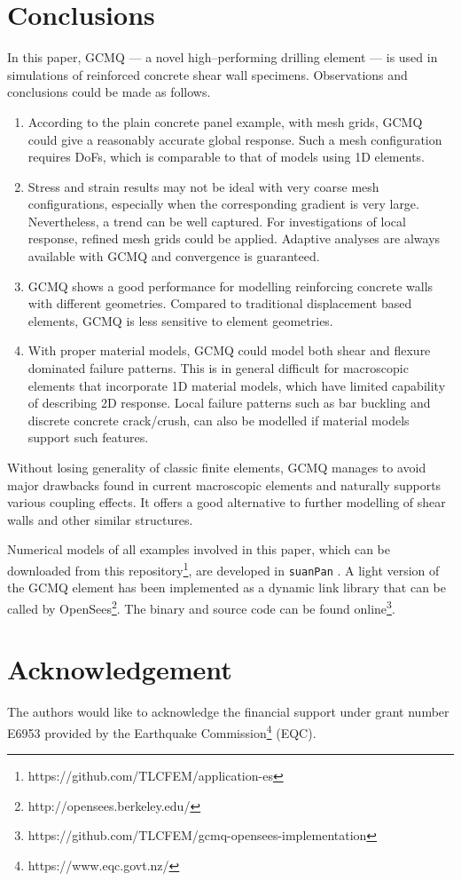 \documentclass[3p,review,sort&compress,11pt,fleqn]{elsarticle}
\begin{document}
\section{Conclusions}
In this paper, GCMQ --- a novel high--performing drilling element --- is used in simulations of reinforced concrete shear wall specimens. Observations and conclusions could be made as follows.
\begin{enumerate}
\item According to the plain concrete panel example, with  mesh grids, GCMQ could give a reasonably accurate global response. Such a mesh configuration requires  DoFs, which is comparable to that of models using 1D elements.
\item Stress and strain results may not be ideal with very coarse mesh configurations, especially when the corresponding gradient is very large. Nevertheless, a trend can be well captured. For investigations of local response, refined mesh grids could be applied. Adaptive analyses are always available with GCMQ and convergence is guaranteed.
\item GCMQ shows a good performance for modelling reinforcing concrete walls with different geometries. Compared to traditional displacement based elements, GCMQ is less sensitive to element geometries.
\item With proper material models, GCMQ could model both shear and flexure dominated failure patterns. This is in general difficult for macroscopic elements that incorporate 1D material models, which have limited capability of describing 2D response. Local failure patterns such as bar buckling and discrete concrete crack/crush, can also be modelled if material models support such features.
\end{enumerate}

Without losing generality of classic finite elements, GCMQ manages to avoid major drawbacks found in current macroscopic elements and naturally supports various coupling effects. It offers a good alternative to further modelling of shear walls and other similar structures.

Numerical models of all examples involved in this paper, which can be downloaded from this repository\footnote{https://github.com/TLCFEM/application-es}, are developed in \texttt{suanPan} \citep{Chang2018}. A light version of the GCMQ element has been implemented as a dynamic link library that can be called by OpenSees\footnote{http://opensees.berkeley.edu/}. The binary and source code can be found online\footnote{https://github.com/TLCFEM/gcmq-opensees-implementation}.
\section*{Acknowledgement}
The authors would like to acknowledge the financial support under grant number E6953 provided by the Earthquake Commission\footnote{https://www.eqc.govt.nz/} (EQC).

\end{document}
